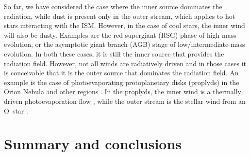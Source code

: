 So far, we have considered the case where the inner source dominates
the radiation, while dust is present only in the outer stream, which
applies to hot stars interacting with the ISM.  However, in the case
of cool stars, the inner wind will also be dusty.  Examples are the
red supergiant (RSG) phase of high-mass evolution, or the asymptotic
giant branch (AGB) stage of low/intermediate-mass evolution.  In both
these cases, it is still the inner source that provides the radiation
field.  However, not all winds are radiatively driven and in those
cases it is conceivable that it is the outer source that dominates the
radiation field.  An example is the case of photoevaporating
protoplanetary disks (proplyds) in the Orion Nebula and other \hii{}
regions \citep{ODell:1994a}.  In the proplyds, the inner wind is a
thermally driven photoevaporation flow \citep{Henney:1998b, Henney:1999a},
while the outer stream is the stellar wind from an O~star
\citep{Garcia-Arredondo:2001a}.


\section{Summary and conclusions}
\label{sec:conclusions}



